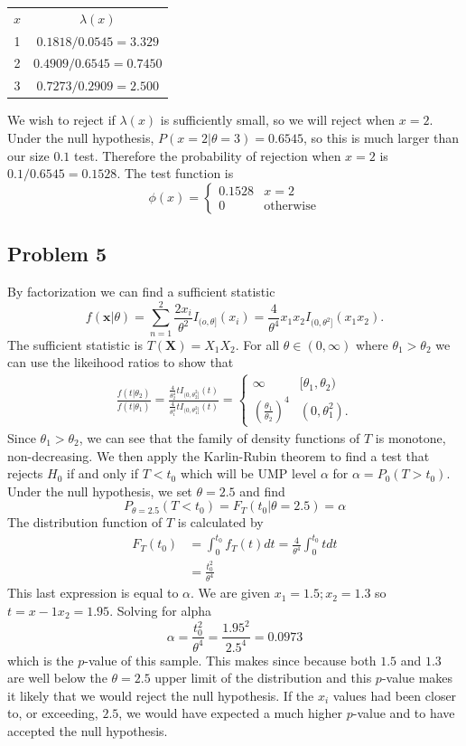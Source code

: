 \documentclass{article}
\begin{document}
\begin{tabular}{ c c }
$x$ & $\lambda(x)$ \\
1 & $0.1818/0.0545 = 3.329$ \\
2 & $0.4909/0.6545 = 0.7450$\\
3 & $0.7273/0.2909 = 2.500$
\end{tabular}

We wish to reject if $\lambda(x)$ is sufficiently small, so we will reject when $x=2$. Under the null hypothesis, $P(x=2|\theta=3) = 0.6545$, so this is much larger than our size $0.1$ test. Therefore the probability of rejection when $x=2$ is $0.1/0.6545 = 0.1528$. The test function is
\[\phi(x)=\begin{cases}0.1528 & x=2 \\ 0 & \text{otherwise}\end{cases}\]

\subsection*{Problem 5}
By factorization we can find a sufficient statistic
\[f(\mathbf{x}|\theta) = \sum_{n=1}^2\frac{2x_i}{\theta^2}I_{(o,\theta]}(x_i) = \frac{4}{\theta^4}x_1x_2I_{(0, \theta^2]}(x_1x_2).\]
The sufficient statistic is $T(\mathbf{X}) = X_1X_2$. For all $\theta\in(0,\infty)$ where $\theta_1 > \theta_2$ we can use the likeihood ratios to show that 
\begin{align*}
\frac{f(t|\theta_2)}{f(t|\theta_1)} = \frac{\frac{4}{\theta_2^4}tI_{(0,\theta_2^2]}(t)}{\frac{4}{\theta_1^4}tI_{(0,\theta_1^2]}(t)} = \begin{cases}\infty & [\theta_1,\theta_2) \\ \left(\frac{\theta_1}{\theta_2}\right)^4 & (0, \theta_1^2). \end{cases}
\end{align*}
Since $\theta_1 > \theta_2$, we can see that the family of density functions of $T$ is monotone, non-decreasing. We then apply the Karlin-Rubin theorem to find a test that rejects $H_0$ if and only if $T < t_0$ which will be UMP level $\alpha$ for $\alpha = P_0(T>t_0)$. Under the null hypothesis, we set $\theta = 2.5$ and find 
\[P_{\theta = 2.5}(T<t_0) = F_T(t_0|\theta = 2.5) = \alpha\]
The distribution function of $T$ is calculated by 
\begin{align*}
F_T(t_0) &= \int_0^{t_0} f_T(t)dt = \frac{4}{\theta^4}\int_0^{t_0}tdt \\&= \frac{t_0^2}{\theta^4}
\end{align*}
This last expression is equal to $\alpha$. We are given $x_1 = 1.5; x_2 = 1.3$ so $t = x-1x_2 = 1.95$. Solving for alpha
\[\alpha = \frac{t_0^2}{\theta^4} = \frac{1.95^2}{2.5^4} = 0.0973\]
which is the $p$-value of this sample. This makes since because both $1.5$ and $1.3$ are well below the $\theta = 2.5$ upper limit of the distribution and this $p$-value makes it likely that we would reject the null hypothesis. If the $x_i$ values had been closer to, or exceeding, $2.5$, we would have expected a much higher $p$-value and to have accepted the null hypothesis. 
\end{document}
